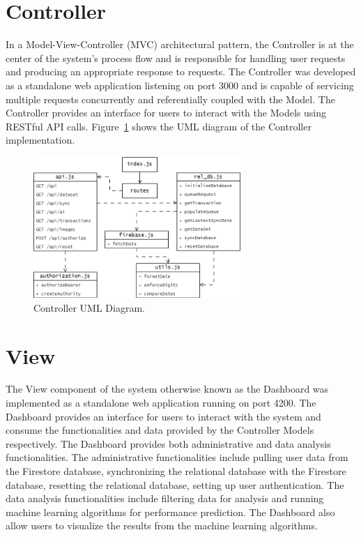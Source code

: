 \section{Controller}
In a Model-View-Controller (MVC) architectural pattern, the Controller is at the center of the system's process flow and is responsible for 
handling user requests and producing an appropriate response to requests. The Controller was developed as a standalone web application
listening on port 3000 and is capable of servicing multiple requests concurrently and referentially coupled with the Model. The Controller
provides an interface for users to interact with the Models using RESTful API calls. Figure~\ref{image:uml_controller} shows the UML diagram of the 
Controller implementation.
\begin{figure}[h!]
    \begin{center}
        \includegraphics[width=0.7\textwidth]{images/uml_controller.png}
        \caption{Controller UML Diagram.}
        \label{image:uml_controller}
    \end{center}
\end{figure}

\section{View}
The View component of the system otherwise known as the Dashboard was implemented as a standalone web application running on port 4200. The 
Dashboard provides an interface for users to interact with the system and consume the functionalities and data provided by the Controller
Models respectively. The Dashboard provides both administrative and data analysis functionalities. The administrative functionalities include
pulling user data from the Firestore database, synchronizing the relational database with the Firestore database, resetting the relational 
database, setting up user authentication. The data analysis functionalities include filtering data for analysis and running machine learning
algorithms for performance prediction. The Dashboard also allow users to visualize the results from the machine learning algorithms. 

